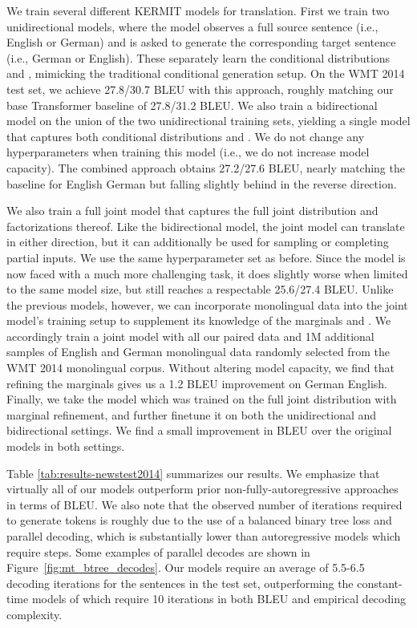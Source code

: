 \documentclass{article}
\begin{document}
We train several different KERMIT models for translation. First we train two unidirectional models, where the model observes a full source sentence (i.e., English or German) and is asked to generate the corresponding target sentence (i.e., German or English). These separately learn the conditional distributions  and , mimicking the traditional conditional generation setup.
On the WMT 2014 test set, we achieve 27.8/30.7 BLEU with this approach, roughly matching our base Transformer baseline of 27.8/31.2 BLEU.
We also train a bidirectional model on the union of the two unidirectional training sets, yielding a single model that captures both conditional distributions  and . We do not change any hyperparameters when training this model (i.e., we do not increase model capacity).
The combined approach obtains 27.2/27.6 BLEU, nearly matching the baseline for English  German but falling slightly behind in the reverse direction.


We also train a full joint model that captures the full joint distribution  and factorizations thereof. Like the bidirectional model, the joint model can translate in either direction, but it can additionally be used for sampling or completing partial inputs. We use the same hyperparameter set as before. Since the model is now faced with a much more challenging task, it does slightly worse when limited to the same model size, but still reaches a respectable 25.6/27.4 BLEU. Unlike the previous models, however, we can incorporate monolingual data into the joint model's training setup to supplement its knowledge of the marginals  and . We accordingly train a joint model with all our paired data and 1M additional samples of English and German monolingual data randomly selected from the WMT 2014 monolingual corpus. Without altering model capacity, we find that refining the marginals gives us a 1.2 BLEU improvement on German  English.
Finally, we take the model which was trained on the full joint distribution with marginal refinement, and further finetune it on both the unidirectional and bidirectional settings. We find a small improvement in BLEU over the original models in both settings.

Table \ref{tab:results-newstest2014} summarizes our results. We emphasize that virtually all of our models outperform prior non-fully-autoregressive approaches in terms of BLEU. We also note that the observed number of iterations required to generate  tokens is roughly  due to the use of a balanced binary tree loss and parallel decoding, which is substantially lower than autoregressive models which require  steps. Some examples of parallel decodes are shown in Figure~\ref{fig:mt_btree_decodes}. Our models require an average of 5.5-6.5 decoding iterations for the sentences in the test set, outperforming the constant-time models of \cite{lee-emnlp-2018} which require 10 iterations in both BLEU and empirical decoding complexity.
\end{document}
